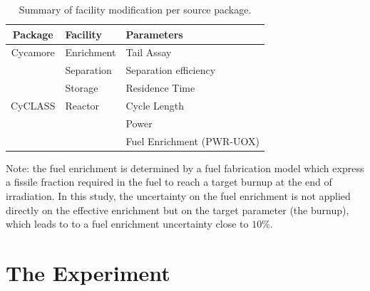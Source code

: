 \documentclass{anstrans}
\begin{document}
\begin{table}[htb]
\centering
  \caption{Summary of facility modification per source package.}
\begin{tabular}{cll}
\toprule

Package   & Facility   & Parameters                \\
\midrule
Cycamore & Enrichment & Tail Assay                \\
         & Separation & Separation efficiency     \\
         & Storage    & Residence Time            \\
\midrule
CyCLASS  & Reactor    & Cycle Length              \\
         &            & Power                     \\
         &            & Fuel Enrichment (PWR-UOX) \\

\bottomrule
\end{tabular}

  \label{tab:package_uncertainty}
\end{table}

Note: the fuel enrichment is determined by a fuel fabrication model\cite{leniau} which
express a fissile fraction required in the fuel to reach a target
burnup at the end of irradiation. In this study, the uncertainty on the fuel
enrichment is not applied directly on the effective enrichment but on the target
parameter (the burnup), which leads to to a fuel enrichment uncertainty close to
$10\%$. 



\section{The Experiment}
\end{document}
